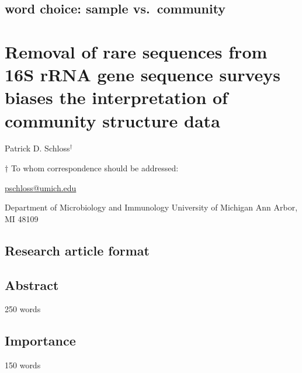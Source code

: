\documentclass[]{article}
\title{}
\author{}
\date{}
\begin{document}
\subsection{word choice: sample
vs.~community}\label{word-choice-sample-vs.community}

\section{Removal of rare sequences from 16S rRNA gene sequence surveys
biases the interpretation of community structure
data}\label{removal-of-rare-sequences-from-16s-rrna-gene-sequence-surveys-biases-the-interpretation-of-community-structure-data}

\vspace{35mm}

Patrick D. Schloss${^\dagger}$

\vspace{40mm}

$\dagger$ To whom correspondence should be addressed:

\href{mailto:pschloss@umich.edu}{pschloss@umich.edu}

Department of Microbiology and Immunology University of Michigan Ann
Arbor, MI 48109

\vspace{35mm}

\subsection{Research article format}\label{research-article-format}

\newpage
\linenumbers

\subsection{Abstract}\label{abstract}

250 words

\newpage

\subsection{Importance}\label{importance}

150 words

\newpage
\end{document}
